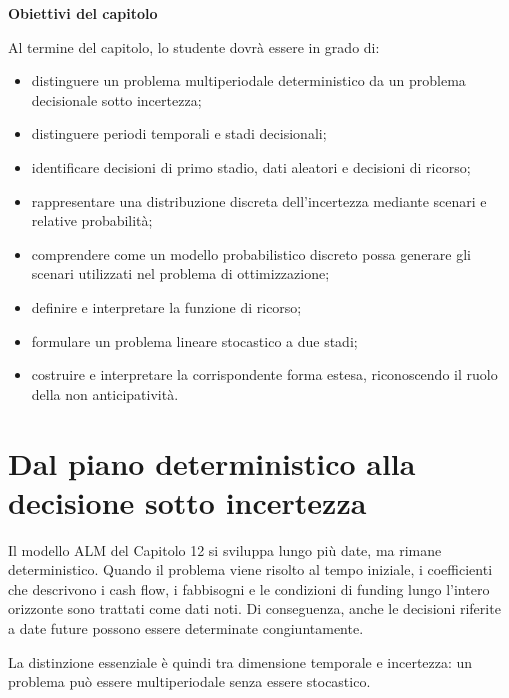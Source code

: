 \medskip

\noindent
\textbf{Obiettivi del capitolo}

Al termine del capitolo, lo studente dovr\`a essere in grado di:

\begin{itemize}

\item distinguere un problema multiperiodale deterministico da un problema
decisionale sotto incertezza;

\item distinguere periodi temporali e stadi decisionali;

\item identificare decisioni di primo stadio, dati aleatori e decisioni di
ricorso;

\item rappresentare una distribuzione discreta dell'incertezza mediante
scenari e relative probabilit\`a;

\item comprendere come un modello probabilistico discreto possa generare gli
scenari utilizzati nel problema di ottimizzazione;

\item definire e interpretare la funzione di ricorso;

\item formulare un problema lineare stocastico a due stadi;

\item costruire e interpretare la corrispondente forma estesa, riconoscendo il
ruolo della non anticipativit\`a.

\end{itemize}

\section{Dal piano deterministico alla decisione sotto incertezza}

\label{sec:cap14-dal-piano-incertezza}

Il modello ALM del Capitolo 12 si sviluppa lungo pi\`u date, ma rimane
deterministico. Quando il problema viene risolto al tempo iniziale, i
coefficienti che descrivono i cash flow, i fabbisogni e le condizioni di
funding lungo l'intero orizzonte sono trattati come dati noti. Di conseguenza,
anche le decisioni riferite a date future possono essere determinate
congiuntamente.

La distinzione essenziale \`e quindi tra dimensione temporale e incertezza:
un problema pu\`o essere multiperiodale senza essere stocastico.

